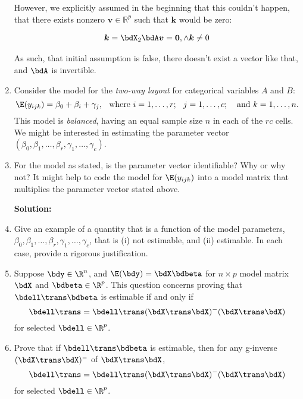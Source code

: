 \begin{enumerate}
\begin{hwanswer}
However, we explicitly assumed in the beginning that this couldn't happen, that there exists nonzero $\bm v \in \mathbb R^p$ such that $\bm k$ would be zero:

\begin{align*}
	\bm k = \bdX_2 \bdA \bm v = \bm 0, \wedge \bm k \neq 0
\end{align*}

 As such, that initial assumption is false, there doesn't exist a vector like that, and $\bdA$ is invertible. 
\end{hwanswer}

\ee
\ee

\item 
Consider the model for the \textit{two-way layout} for 
categorical variables
$A$ and $B$:
\[
\E(y_{ijk}) = \beta_0 + \beta_i + \gamma_j, \hspace{0.1 in}
\text{where } i = 1, \dots, r; \hspace{0.1 in} j = 1, \dots,
c;\hspace{0.1 in} \text{ and } k = 1, \dots, n.
\]
This model is \textit{balanced}, having an equal sample size $n$ in each 
of the $rc$ cells. 
We might be interested in estimating the parameter vector
$(\beta_0, \beta_1,\ldots, \beta_r, \gamma_1,\ldots,\gamma_c)$.
\be
\item For the model as stated, is the parameter vector identifiable? 
Why or why not?
It might help to code the model for $\E(y_{ijk})$ into a model matrix 
that multiplies the parameter vector stated above.

\textbf{Solution: }

\item Give an example of a quantity that is a function of
the model parameters,
$\beta_0, \beta_1,\ldots, \beta_r, \gamma_1,\ldots,\gamma_c$,
that is (i) not estimable, and (ii) estimable. 
In each case, provide a rigorous justification.
\ee

\item 
Suppose $\bdy \in \R^n$, and $\E(\bdy) = \bdX\bdbeta$ for
$n\times p$ model matrix $\bdX$ and $\bdbeta \in \R^p$.
This question concerns proving
that $\bdell\trans\bdbeta$ is estimable if and only if
\[
\bdell\trans = \bdell\trans (\bdX\trans\bdX)^{-}(\bdX\trans\bdX) 
\]
for selected $\bdell \in \R^p$.
\be
\item 
Prove that if $\bdell\trans\bdbeta$ is estimable, then
for any g-inverse 
$(\bdX\trans\bdX)^{-}$
of $\bdX\trans\bdX$,
\[
\bdell\trans = \bdell\trans (\bdX\trans\bdX)^{-}(\bdX\trans\bdX) 
\]
for selected $\bdell \in \R^p$.


\end{enumerate}
